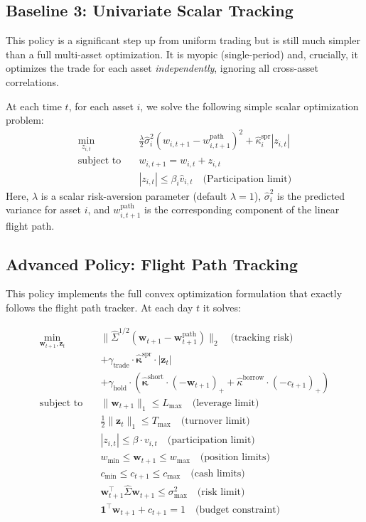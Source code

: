 \documentclass[11pt, letterpaper]{article}
\newcommand{\vect}[1]{\boldsymbol{#1}}
\begin{document}
\subsection{Baseline 3: Univariate Scalar Tracking}
This policy is a significant step up from uniform trading but is still much simpler than a full multi-asset optimization. It is myopic (single-period) and, crucially, it optimizes the trade for each asset \textit{independently}, ignoring all cross-asset correlations.

At each time $t$, for each asset $i$, we solve the following simple scalar optimization problem:
\begin{align*}
\min_{z_{i,t}} \quad & \frac{\lambda}{2}\hat{\sigma}_i^2 \left(w_{i,t+1} - w_{i,t+1}^{\text{path}}\right)^2 + \hat{\kappa}_i^{\text{spr}} |z_{i,t}| \\
\text{subject to} \quad & w_{i,t+1} = w_{i,t} + z_{i,t} \\
& |z_{i,t}| \le \beta_i \hat{v}_{i,t} \quad \text{(Participation limit)}
\end{align*}
Here, $\lambda$ is a scalar risk-aversion parameter (default $\lambda=1$), $\hat{\sigma}_i^2$ is the predicted variance for asset $i$, and $w_{i,t+1}^{\text{path}}$ is the corresponding component of the linear flight path.

\subsection{Advanced Policy: Flight Path Tracking}
This policy implements the full convex optimization formulation that exactly follows the flight path tracker. At each day $t$ it solves:

\begin{align*}
\min_{\vect{w}_{t+1}, \vect{z}_t} \quad & \|\hat{\Sigma}^{1/2} (\vect{w}_{t+1} - \vect{w}^{\text{path}}_{t+1})\|_2 \quad \text{(tracking risk)} \\
& + \gamma_{\text{trade}} \cdot \hat{\vect{\kappa}}^{\text{spr}} \cdot |\vect{z}_t| \\
& + \gamma_{\text{hold}} \cdot (\hat{\vect{\kappa}}^{\text{short}} \cdot (-\vect{w}_{t+1})_+ + \hat{\kappa}^{\text{borrow}} \cdot (-c_{t+1})_+) \\
\text{subject to} \quad & \|\vect{w}_{t+1}\|_1 \le L_{\max} \quad \text{(leverage limit)} \\
& \frac{1}{2}\|\vect{z}_t\|_1 \le T_{\max} \quad \text{(turnover limit)} \\
& |z_{i,t}| \le \beta \cdot v_{i,t} \quad \text{(participation limit)} \\
& w_{\min} \le \vect{w}_{t+1} \le w_{\max} \quad \text{(position limits)} \\
& c_{\min} \le c_{t+1} \le c_{\max} \quad \text{(cash limits)} \\
& \vect{w}_{t+1}^\top \hat{\Sigma} \vect{w}_{t+1} \le \sigma^2_{\max} \quad \text{(risk limit)} \\
& \mathbf{1}^\top \vect{w}_{t+1} + c_{t+1} = 1 \quad \text{(budget constraint)}
\end{align*}
\end{document}
